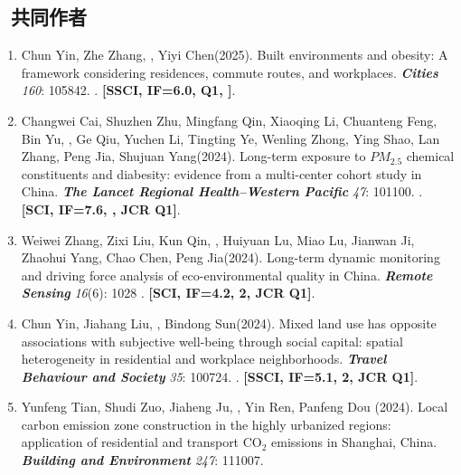 \subsection*{\texorpdfstring{\faBook\ 共同作者}{共同作者}}
\begin{enumerate}
\item
    Chun Yin\CS, Zhe Zhang, \Shaoqing, Yiyi Chen\CS (2025).
    Built environments and obesity: A framework considering residences, commute routes, and workplaces.
    \textbf{\textit{Cities}} \textit{160}: 105842.
    . \textbf{[SSCI, IF=6.0, Q1, ]}.
\item
    Changwei Cai\CF, Shuzhen Zhu\CF, Mingfang Qin\CF, Xiaoqing Li\CF, Chuanteng Feng, Bin Yu, \Shaoqing, Ge Qiu, Yuchen Li, Tingting Ye, Wenling Zhong, Ying Shao, Lan Zhang, Peng Jia\CS, Shujuan Yang\CS (2024).
    Long-term exposure to $PM_{2.5}$ chemical constituents and diabesity: evidence from a multi-center cohort study in China. 
    \textbf{\textit{The Lancet Regional Health–Western Pacific}} \textit{47}: 101100.
    . \textbf{[SCI, IF=7.6, , JCR Q1]}.
\item
    Weiwei Zhang, Zixi Liu, Kun Qin, \Shaoqing, Huiyuan Lu, Miao Lu, Jianwan Ji, Zhaohui Yang, Chao Chen, Peng Jia\CS (2024).
    Long-term dynamic monitoring and driving force analysis of eco-environmental quality in China. 
    \textbf{\textit{Remote Sensing}} \textit{16}(6): 1028
    . 
    \textbf{[SCI, IF=4.2, 2, JCR Q1]}.
\item
    Chun Yin, Jiahang Liu, \Shaoqing, Bindong Sun\CS (2024).
    Mixed land use has opposite associations with subjective well-being through social capital: spatial heterogeneity in residential and workplace neighborhoods.
    \textbf{\textit{Travel Behaviour and Society}} \textit{35}: 100724.
    . 
    \textbf{[SSCI, IF=5.1, 2, JCR Q1]}.
\item
    Yunfeng Tian, Shudi Zuo\CS, Jiaheng Ju, \Shaoqing, Yin Ren, Panfeng Dou (2024).
    Local carbon emission zone construction in the highly urbanized regions: application of residential and transport CO$_2$ emissions in Shanghai, China.
    \textbf{\textit{Building and Environment}} \textit{247}: 111007.

\end{enumerate}
